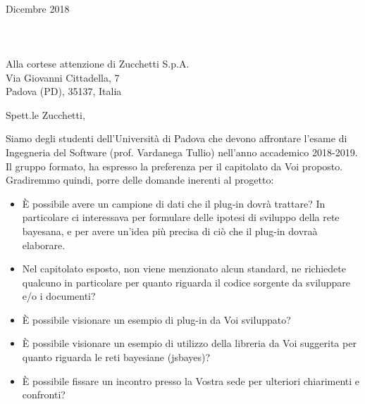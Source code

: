 \documentclass[11pt, a4paper]{letter} %
\begin{document}

\begin{letter}{
	\-\\ Dicembre 2018
	\-\\\-\\\-\\\-\\
	Alla cortese attenzione di Zucchetti S.p.A.\\
	Via Giovanni Cittadella, 7\\
	Padova (PD), 35137, Italia
}


\opening{Spett.le Zucchetti,}

Siamo degli studenti dell'Università di Padova che devono affrontare l'esame di Ingegneria del Software (prof. Vardanega Tullio) nell'anno accademico 2018-2019.\\
Il gruppo formato, ha espresso la preferenza per il capitolato da Voi proposto. Gradiremmo quindi, porre delle domande inerenti al progetto:
\begin{itemize}	
	\item È possibile avere un campione di dati che il plug-in dovrà trattare? In particolare ci interessava per formulare delle ipotesi di sviluppo della rete bayesana, e per avere un'idea più precisa di ciò che il plug-in dovraà elaborare.
	\item Nel capitolato esposto, non viene menzionato alcun standard, ne richiedete qualcuno in particolare per quanto riguarda il codice sorgente da sviluppare e/o i documenti?
	\item È possibile visionare un esempio di plug-in da Voi sviluppato?
	\item È possibile visionare un esempio di utilizzo della libreria da Voi suggerita per quanto riguarda le reti bayesiane (jsbayes)?
	\item È possibile fissare un incontro presso la Vostra sede per ulteriori chiarimenti e confronti?	
\end{itemize}


\end{letter}
\end{document}
